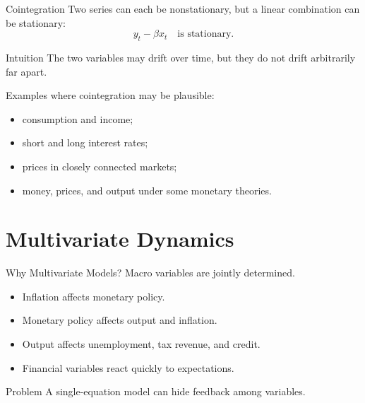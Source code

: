 \documentclass[11pt,aspectratio=169]{beamer}
\begin{document}
\begin{frame}{Cointegration}
  Two series can each be nonstationary, but a linear combination can be stationary:
  \[
    y_t-\beta x_t \quad \text{is stationary}.
  \]

  \begin{block}{Intuition}
    The two variables may drift over time, but they do not drift arbitrarily far apart.
  \end{block}

  Examples where cointegration may be plausible:
  \begin{itemize}
    \item consumption and income;
    \item short and long interest rates;
    \item prices in closely connected markets;
    \item money, prices, and output under some monetary theories.
  \end{itemize}
\end{frame}

\section{Multivariate Dynamics}

\begin{frame}{Why Multivariate Models?}
  Macro variables are jointly determined.

  \begin{itemize}
    \item Inflation affects monetary policy.
    \item Monetary policy affects output and inflation.
    \item Output affects unemployment, tax revenue, and credit.
    \item Financial variables react quickly to expectations.
  \end{itemize}

  \begin{block}{Problem}
    A single-equation model can hide feedback among variables.
  \end{block}
\end{frame}
\end{document}
